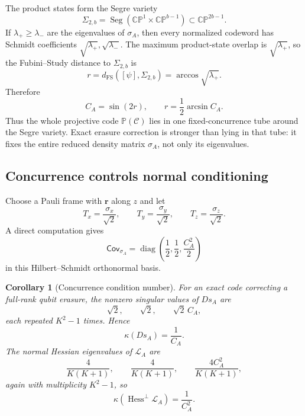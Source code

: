 \documentclass[11pt]{article}
\newtheorem{corollary}[theorem]{Corollary}
\theoremstyle{definition}
\newcommand{\cC}{\mathcal C}
\newcommand{\cL}{\mathcal L}
\newcommand{\Pj}{\mathbb P}
\newcommand{\CP}{\mathbb{CP}}
\newcommand{\1}{\mathbf 1}
\begin{document}
The product states form the Segre variety
\[
\Sigma_{2,b}
=\operatorname{Seg}(\CP^1\times\CP^{b-1})
\subset\CP^{2b-1}.
\]
If $\lambda_+\ge\lambda_-$ are the eigenvalues of $\sigma_A$, then every normalized codeword has Schmidt coefficients $\sqrt{\lambda_+},\sqrt{\lambda_-}$.  The maximum product-state overlap is $\sqrt{\lambda_+}$, so the Fubini--Study distance to $\Sigma_{2,b}$ is
\begin{equation}
r=d_{\mathrm{FS}}([\psi],\Sigma_{2,b})
=\arccos\sqrt{\lambda_+}.
\label{eq:fs-distance}
\end{equation}
Therefore
\begin{equation}
\boxed{
C_A=\sin(2r),
\qquad
r=\frac12\arcsin C_A.
}
\label{eq:concurrence-distance}
\end{equation}
Thus the whole projective code $\Pj(\cC)$ lies in one fixed-concurrence tube around the Segre variety.  Exact erasure correction is stronger than lying in that tube: it fixes the entire reduced density matrix $\sigma_A$, not only its eigenvalues.

\subsection{Concurrence controls normal conditioning}

Choose a Pauli frame with $\bm r$ along $z$ and let
\[
T_x=\frac{\sigma_x}{\sqrt2},\qquad
T_y=\frac{\sigma_y}{\sqrt2},\qquad
T_z=\frac{\sigma_z}{\sqrt2}.
\]
A direct computation gives
\begin{equation}
\mathsf{Cov}_{\sigma_A}
=\operatorname{diag}\left(
\frac12,\frac12,\frac{C_A^2}{2}
\right)
\label{eq:qubit-covariance}
\end{equation}
in this Hilbert--Schmidt orthonormal basis.

\begin{corollary}[Concurrence condition number]
\label{cor:concurrence}
For an exact code correcting a full-rank qubit erasure, the nonzero singular values of $Ds_A$ are
\begin{equation}
\boxed{
\sqrt2,\qquad \sqrt2,\qquad \sqrt2\,C_A,
}
\label{eq:qubit-singular}
\end{equation}
each repeated $K^2-1$ times.  Hence
\begin{equation}
\boxed{
\kappa(Ds_A)=\frac1{C_A}.
}
\label{eq:condition-number}
\end{equation}
The normal Hessian eigenvalues of $\cL_A$ are
\begin{equation}
\frac{4}{K(K+1)},\qquad
\frac{4}{K(K+1)},\qquad
\frac{4C_A^2}{K(K+1)},
\label{eq:qubit-hessian}
\end{equation}
again with multiplicity $K^2-1$, so
\begin{equation}
\kappa\!\left(\operatorname{Hess}^{\perp}\cL_A\right)=\frac1{C_A^2}.
\end{equation}
\end{corollary}
\end{document}
